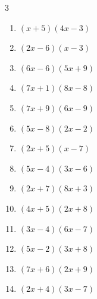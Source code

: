 \begin{multicols}{3}
\begin{enumerate}

\columnbreak %

  \item $(x+5)(4x-3)$


  \item $(2x-6)(x-3)$


  \item $(6x-6)(5x+9)$


  \item $(7x+1)(8x-8)$


  \item $(7x+9)(6x-9)$


  \item $(5x-8)(2x-2)$


  \item $(2x+5)(x-7)$


  \item $(5x-4)(3x-6)$


  \item $(2x+7)(8x+3)$


  \item $(4x+5)(2x+8)$


  \item $(3x-4)(6x-7)$


  \item $(5x-2)(3x+8)$


  \item $(7x+6)(2x+9)$


  \item $(2x+4)(3x-7)$



\end{enumerate}
\end{multicols}

